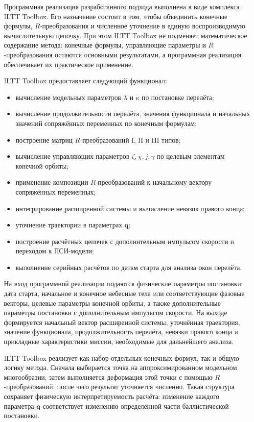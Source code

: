 Программная реализация разработанного подхода выполнена в виде комплекса ILTT Toolbox. Его назначение состоит в том, чтобы объединить конечные формулы, \(R\)-преобразования и численное уточнение в единую воспроизводимую вычислительную цепочку. При этом ILTT Toolbox не подменяет математическое содержание метода: конечные формулы, управляющие параметры и \(R\)-преобразования остаются основными результатами, а программная реализация обеспечивает их практическое применение.

ILTT Toolbox предоставляет следующий функционал:
\begin{itemize}
	\item вычисление модельных параметров \(\lambda\) и \(\kappa\) по постановке перелёта;
	\item вычисление продолжительности перелёта, значения функционала и начальных значений сопряжённых переменных по конечным формулам;
	\item построение матриц \(R\)-преобразований I, II и III типов;
	\item вычисление управляющих параметров \(\zeta,\chi,j,\gamma\) по целевым элементам конечной орбиты;
	\item применение композиции \(R\)-преобразований к начальному вектору сопряжённых переменных;
	\item интегрирование расширенной системы и вычисление невязок правого конца;
	\item уточнение траектории в параметрах \(\mathbf q\);
	\item
построение расчётных цепочек с дополнительным импульсом скорости и переходом к ПСИ-модели;
	\item выполнение серийных расчётов по датам старта для анализа окон перелёта.
\end{itemize}

На вход программной реализации подаются физические параметры постановки: дата старта, начальное и конечное небесные тела или соответствующие фазовые векторы, целевые параметры конечной орбиты, а также дополнительные параметры постановки с дополнительным импульсом скорости. На выходе формируется начальный вектор расширенной системы, уточнённая траектория, значение функционала, продолжительность перелёта, невязки правого конца и прикладные характеристики миссии, необходимые для дальнейшего анализа.

ILTT Toolbox реализует как набор отдельных конечных формул, так и общую логику метода. Сначала выбирается точка на аппроксимированном модельном многообразии, затем выполняется деформация этой точки с помощью \(R\)-преобразований, после чего результат уточняется численно. Такая структура сохраняет физическую интерпретируемость расчёта: изменение каждого параметра \(\mathbf q\) соответствует изменению определённой части баллистической постановки.

